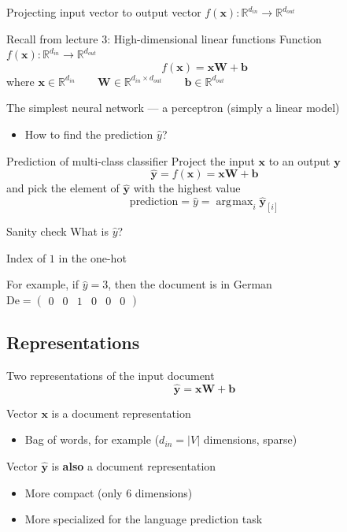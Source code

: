 \documentclass[12pt,aspectratio=169,handout]{beamer}
\DeclareMathOperator*{\argmax}{arg\!\max}
\begin{document}
\begin{frame}{Projecting input vector to output vector $f(\bm{x}) : \mathbb{R}^{d_{in}} \to \mathbb{R}^{d_{out}}$}
	
\pause
\begin{block}{Recall from lecture 3: High-dimensional linear functions}
Function $f(\bm{x}) : \mathbb{R}^{d_{in}} \to \mathbb{R}^{d_{out}}$
$$f(\bm{x}) = \bm{x} \bm{W} + \bm{b}$$
where
$\bm{x} \in \mathbb{R}^{d_{in}} \qquad
\bm{W} \in \mathbb{R}^{d_{in} \times d_{out}} \qquad
\bm{b} \in \mathbb{R}^{d_{out}}$
\end{block}	
	
The simplest neural network --- a perceptron (simply a linear model)

\begin{itemize}
	\item How to find the prediction $\hat{y}$?
\end{itemize}

\end{frame}

\begin{frame}{Prediction of multi-class classifier}
Project the input $\bm{x}$ to an output $\bm{y}$
$$\bm{\hat{y}} = f(\bm{x}) = \bm{x} \bm{W} + \bm{b}$$
and pick the element of $\bm{\hat{y}}$ with the highest value
$$
\text{prediction} = \hat{y} = \argmax_{i} \bm{\hat{y}}_{[i]}
$$

\begin{block}{Sanity check}
What is $\hat{y}$?

\pause
Index of $1$ in the one-hot

For example, if $\hat{y} = 3$, then the document is in German
$\text{De} = \begin{pmatrix}0 & 0 & 1 & 0 & 0 & 0\end{pmatrix}$
\end{block}
	
\end{frame}

\subsection{Representations}


\begin{frame}{Two representations of the input document}
$$\bm{\hat{y}} = \bm{x} \bm{W} + \bm{b}$$

Vector $\bm{x}$ is a document representation
\begin{itemize}
	\item Bag of words, for example ($d_{in} = |V|$ dimensions, sparse)
\end{itemize}

Vector $\bm{\hat{y}}$ is \textbf{also} a document representation
\begin{itemize}
	\item More compact (only 6 dimensions)
	\item More specialized for the language prediction task
\end{itemize}

\end{frame}
\end{document}
